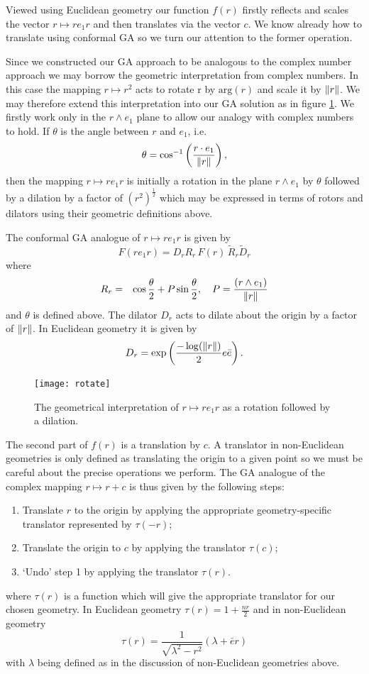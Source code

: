 Viewed using Euclidean geometry our function $f(r)$ firstly reflects and
scales the vector $r \mapsto re_1r$ and then translates via the vector $c$. We
know already how to translate using conformal GA so we turn our attention to
the former operation.

Since we constructed our GA approach to be analogous to the complex number approach we
may borrow the geometric interpretation from complex numbers. In this case the mapping 
$r \mapsto r^2$ acts to rotate r by $\mathrm{arg}(r)$ and scale it by
$\left\Vert r \right\Vert$. We may therefore extend this interpretation into our GA solution as in
figure \ref{fig:rotate}. We firstly work only in the $r \wedge e_1$ plane to allow
our analogy with complex numbers to hold. If $\theta$ is the angle between $r$ and
$e_1$, i.e.
\[
\theta = \cos^{-1}\left(\frac{r \cdot e_1}{\left\Vert r \right\Vert}\right),
\] 
then the mapping $r \mapsto re_1r$ is initially a rotation in the plane $r \wedge e_1$
by $\theta$ followed by a dilation by a factor of $(r^2)^\frac{1}{2}$ 
which may be expressed in terms of rotors and dilators using their geometric
definitions above.

\begin{definition}
The conformal GA analogue of $r \mapsto re_1r$ is given by
\[
F(re_1r) = D_r R_r\,F(r)\,\tilde{R}_r \tilde{D}_r
\]
where
\begin{eqnarray*}
R_r & = & \cos \frac{\theta}{2} + P \sin \frac{\theta}{2},
    \quad
P = \frac{(r \wedge e_1)}{\left\Vert r \right\Vert}
\end{eqnarray*}
and $\theta$ is defined above.
The dilator $D_r$ acts to dilate about the origin by a factor of
$\left\Vert r \right\Vert$. In Euclidean geometry it is given by
\[
D_r = \exp\left( \frac{-\log(\left\Vert r \right\Vert)}{2} e\bar{e} \right).
\]
\end{definition}

\begin{figure}
\centering
\texttt{[image: rotate]}
\caption{\label{fig:rotate}%
  The geometrical interpretation of $r \mapsto re_1r$ as a rotation followed by a dilation.
}
\end{figure}

The second part of $f(r)$ is a translation by $c$. A translator in non-Euclidean
geometries is only defined as translating the origin to a given point so we must be
careful about the precise operations we perform. The GA analogue of the
complex mapping $r \mapsto r + c$ is thus given by the following steps:
\begin{enumerate}
\item Translate $r$ to the origin by applying the appropriate geometry-specific translator represented by $\tau(-r)$;
\item Translate the origin to $c$ by applying the translator $\tau(c)$;
\item `Undo' step 1 by applying the translator $\tau(r)$.
\end{enumerate}
where $\tau(r)$ is a function which will give the appropriate translator for our 
chosen geometry. In Euclidean geometry $\tau(r) = 1 + \frac{nr}{2}$ and in
non-Euclidean geometry
\[
\tau(r) = \frac{1}{\sqrt{\lambda^2 - r^2}}(\lambda + \bar{e}r)
\]
with $\lambda$ being defined as in the discussion of non-Euclidean geometries above.


